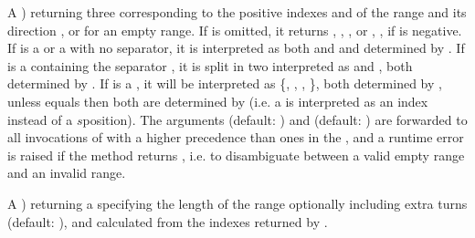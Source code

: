 \documentclass[letterpaper,10pt,english]{sphinxmanual}
\begin{document}
\begin{description}
\sphinxAtStartPar
A  \sphinxcode{\sphinxupquote{({[}rng{]}, {[}ref{]}, {[}dir{]}}}) returning three  corresponding to the positive indexes  and  of the range and
its direction , or  for an empty range. If  is omitted, it returns , , , or , , 
if  is negative. If  is a  or a  with no \sphinxcode{\sphinxupquote{\textquotesingle{}/\textquotesingle{}}} separator, it is interpreted as both  and  and
determined by . If  is a  containing the separator \sphinxcode{\sphinxupquote{\textquotesingle{}/\textquotesingle{}}}, it is split in two  interpreted as 
and , both determined by . If  is a , it will be interpreted as \{, , \sphinxcode{\sphinxupquote{{[}ref{]}}}, \sphinxcode{\sphinxupquote{{[}dir{]}}}\},
both determined by , unless  equals  then both are determined by  (i.e. a  is interpreted as an
index instead of a \(s\)\sphinxhyphen{}position). The arguments  (default: ) and  (default: ) are forwarded to all invocations
of  with a higher precedence than ones in the  , and a runtime error is raised if the method returns , i.e.
to disambiguate between a valid empty range and an invalid range.

\sphinxAtStartPar
A  \sphinxcode{\sphinxupquote{({[}rng{]}, {[}ntrn{]}, {[}dir{]}}}) returning a  specifying the length of the range optionally including  extra turns (default: ),
and calculated from the indexes returned by .


\end{description}
\end{document}
